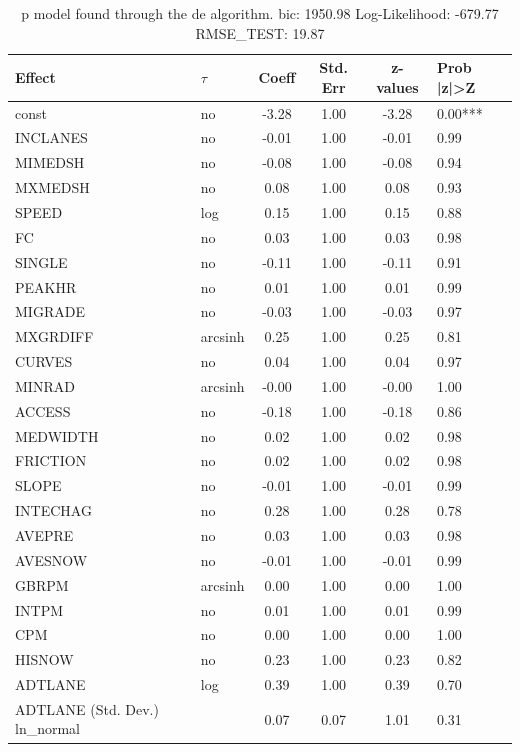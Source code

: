 \begin{table}
	\caption{p model found through the de algorithm. bic: 1950.98 Log-Likelihood: -679.77 RMSE_TEST: 19.87}
	\begin{center}
		\begin{tabular}{|l|l|c|c|c|l|}
			\hline
			Effect & $\tau$ & Coeff & Std. Err & z-values & Prob |z|>Z \\
			\hline
			const & no & -3.28 & 1.00 & -3.28 & 0.00*** \\
			\hline
			INCLANES & no & -0.01 & 1.00 & -0.01 & 0.99 \\
			\hline
			MIMEDSH & no & -0.08 & 1.00 & -0.08 & 0.94 \\
			\hline
			MXMEDSH & no & 0.08 & 1.00 & 0.08 & 0.93 \\
			\hline
			SPEED & log & 0.15 & 1.00 & 0.15 & 0.88 \\
			\hline
			FC & no & 0.03 & 1.00 & 0.03 & 0.98 \\
			\hline
			SINGLE & no & -0.11 & 1.00 & -0.11 & 0.91 \\
			\hline
			PEAKHR & no & 0.01 & 1.00 & 0.01 & 0.99 \\
			\hline
			MIGRADE & no & -0.03 & 1.00 & -0.03 & 0.97 \\
			\hline
			MXGRDIFF & arcsinh & 0.25 & 1.00 & 0.25 & 0.81 \\
			\hline
			CURVES & no & 0.04 & 1.00 & 0.04 & 0.97 \\
			\hline
			MINRAD & arcsinh & -0.00 & 1.00 & -0.00 & 1.00 \\
			\hline
			ACCESS & no & -0.18 & 1.00 & -0.18 & 0.86 \\
			\hline
			MEDWIDTH & no & 0.02 & 1.00 & 0.02 & 0.98 \\
			\hline
			FRICTION & no & 0.02 & 1.00 & 0.02 & 0.98 \\
			\hline
			SLOPE & no & -0.01 & 1.00 & -0.01 & 0.99 \\
			\hline
			INTECHAG & no & 0.28 & 1.00 & 0.28 & 0.78 \\
			\hline
			AVEPRE & no & 0.03 & 1.00 & 0.03 & 0.98 \\
			\hline
			AVESNOW & no & -0.01 & 1.00 & -0.01 & 0.99 \\
			\hline
			GBRPM & arcsinh & 0.00 & 1.00 & 0.00 & 1.00 \\
			\hline
			INTPM & no & 0.01 & 1.00 & 0.01 & 0.99 \\
			\hline
			CPM & no & 0.00 & 1.00 & 0.00 & 1.00 \\
			\hline
			HISNOW & no & 0.23 & 1.00 & 0.23 & 0.82 \\
			\hline
			ADTLANE & log & 0.39 & 1.00 & 0.39 & 0.70 \\
			\hline
			ADTLANE (Std. Dev.) ln_normal &  & 0.07 & 0.07 & 1.01 & 0.31 \\
			\hline
		\end{tabular}
	\end{center}
\end{table}